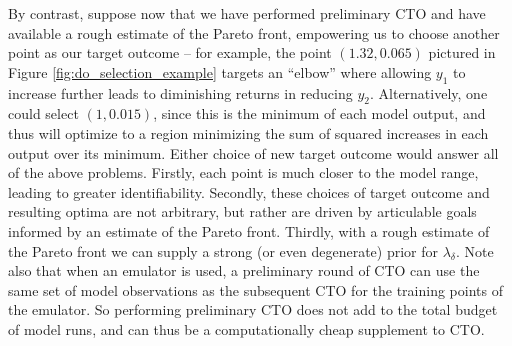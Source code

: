 \documentclass[12pt]{article}
\begin{document}
%
By contrast, suppose now that we have performed preliminary CTO and have available a rough estimate of the Pareto front, empowering us to choose another point as our target outcome -- for example, the point $(1.32,0.065)$ pictured in Figure \ref{fig:do_selection_example} targets an ``elbow'' where allowing $y_1$ to increase further leads to diminishing returns in reducing $y_2$.
%
Alternatively, one could select $(1,0.015)$, since this is the minimum of each model output, and thus will optimize to a region minimizing the sum of squared increases in each output over its minimum.
%
Either choice of new target outcome would answer all of the above problems.
%
Firstly, each point is much closer to the model range, leading to greater identifiability.
%
Secondly, these choices of target outcome and resulting optima are not arbitrary, but rather are driven by articulable goals informed by an estimate of the Pareto front.
%
Thirdly, with a rough estimate of the Pareto front we can supply a strong (or even degenerate) prior for $\lambda_\delta$.
%
Note also that when an emulator is used, a preliminary round of CTO can use the same set of model observations as the subsequent CTO for the training points of the emulator.
%
So performing preliminary CTO does not add to the total budget of model runs, and can thus be a computationally cheap supplement to CTO.
\end{document}
